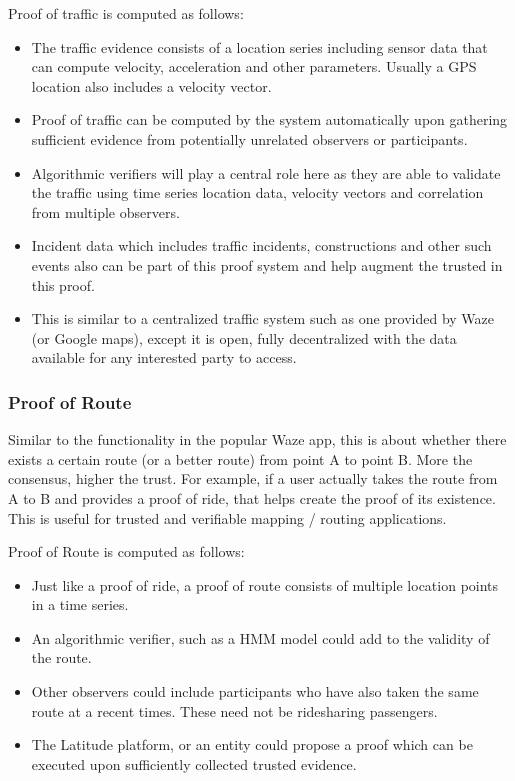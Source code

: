 Proof of traffic is computed as follows:

\begin{itemize}
    \item The traffic evidence consists of a location series including sensor data that can compute velocity,
        acceleration and other parameters. Usually a GPS location also includes a velocity vector.
    \item Proof of traffic can be computed by the system automatically upon gathering sufficient evidence from
        potentially unrelated observers or participants.
    \item Algorithmic verifiers will play a central role here as they are able to validate the traffic using time series
        location data, velocity vectors and correlation from multiple observers.
    \item Incident data which includes traffic incidents, constructions and other such events also can be part of this
        proof system and help augment the trusted in this proof.
    \item This is similar to a centralized traffic system such as one provided by Waze (or Google maps), except it is
        open, fully decentralized with the data available for any interested party to access.
\end{itemize}

\subsubsection{Proof of Route}

Similar to the functionality in the popular Waze app, this is about whether there exists
a certain route (or a better route) from point A to point B. More the consensus, higher the trust. For example, if a
user actually takes the route from A to B and provides a proof of ride, that helps create the proof of its existence.
This is useful for trusted and verifiable mapping / routing applications.

Proof of Route is computed as follows:

\begin{itemize}
    \item Just like a proof of ride, a proof of route consists of multiple location points in a time series.
    \item An algorithmic verifier, such as a HMM model could add to the validity of the route.
    \item Other observers could include participants who have also taken the same route at a recent times. These need
        not be ridesharing passengers.
    \item The Latitude platform, or an entity could propose a proof which can be executed upon sufficiently collected
        trusted evidence.
\end{itemize}

